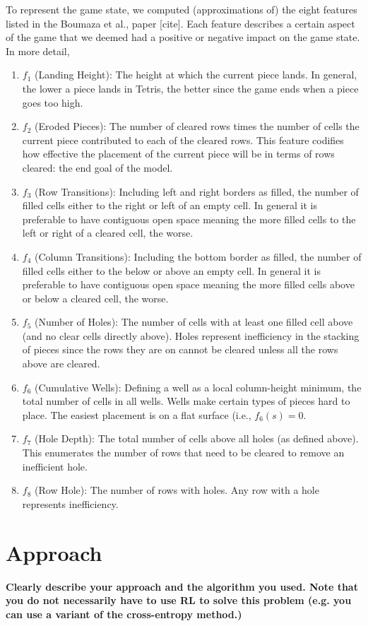 \documentclass[12pt,letterpaper]{article}
\begin{document}
To represent the game state, we computed (approximations of) the eight features listed in the Boumaza et al., paper [cite]. Each feature describes a certain aspect of the game that we deemed had a positive or negative impact on the game state. In more detail,
\begin{enumerate}
    \item $f_1$ (Landing Height): The height at which the current piece lands. In general, the lower a piece lands in Tetris, the better since the game ends when a piece goes too high.
    \item $f_2$ (Eroded Pieces): The number of cleared rows times the number of cells the current piece contributed to each of the cleared rows. This feature codifies how effective the placement of the current piece will be in terms of rows cleared: the end goal of the model.
    \item $f_3$ (Row Transitions): Including left and right borders as filled, the number of filled cells either to the right or left of an empty cell. In general it is preferable to have contiguous open space meaning the more filled cells to the left or right of a cleared cell, the worse.
    \item $f_4$ (Column Transitions): Including the bottom border as filled, the number of filled cells either to the below or above an empty cell. In general it is preferable to have contiguous open space meaning the more filled cells above or below a cleared cell, the worse.
    \item $f_5$ (Number of Holes): The number of cells with at least one filled cell above (and no clear cells directly above). Holes represent inefficiency in the stacking of pieces since the rows they are on cannot be cleared unless all the rows above are cleared.
    \item $f_6$ (Cumulative Wells): Defining a well as a local column-height minimum, the total number of cells in all wells. Wells make certain types of pieces hard to place. The easiest placement is on a flat surface (i.e., $f_6(s) = 0$.
    \item $f_7$ (Hole Depth): The total number of cells above all holes (as defined above). This enumerates the number of rows that need to be cleared to remove an inefficient hole.
    \item $f_8$ (Row Hole): The number of rows with holes. Any row with a hole represents inefficiency.
\end{enumerate}

\section{Approach}
\textbf{Clearly describe your approach and the algorithm you used. Note that you do not necessarily have to use RL to solve this problem (e.g. you can use a variant of the cross-entropy method.)}
\end{document}
